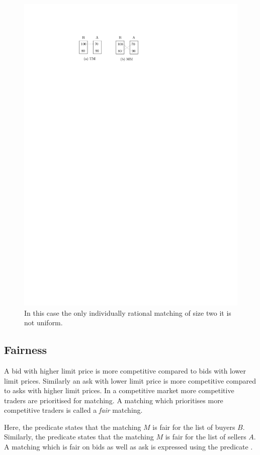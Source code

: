 \documentclass[a4paper,UKenglish,cleveref, autoref]{lipics-v2019}
\begin{document}
\begin{figure}[h!]
\centering
\includegraphics[width=.35\textwidth]{mm_um.pdf}
\caption{In this case the only individually rational matching of size two it is not uniform.}
\label{fig:mmum}
\end{figure}

\subsection{Fairness}  

A bid with higher limit price is more competitive compared to bids with lower limit prices. Similarly an ask with lower limit price is more competitive compared to asks with higher limit prices. In a competitive market more competitive traders are prioritised for matching. A matching which prioritises more competitive traders is called a \emph{fair} matching. 

\begin{definition}
 \end{definition}
\begin{definition}
\end{definition}
\begin{definition}
\end{definition}

Here, the predicate   states that the matching $M$  is fair for the list of buyers $B$. Similarly,  the predicate  states that the matching $M$  is fair for the list of sellers $A$.  A matching which is fair on bids as well as ask is expressed using the predicate .
\end{document}
